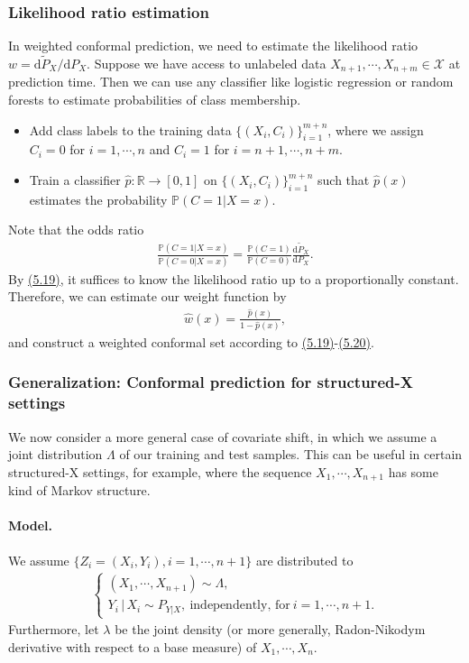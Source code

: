 \documentclass{article}
\numberwithin{equation}{section}
\begin{document}
\subsubsection{Likelihood ratio estimation}
In weighted conformal prediction, we need to estimate the likelihood ratio $w=\mathrm{d}\widetilde{P}_X/\mathrm{d}P_X$. Suppose we have access to unlabeled data $X_{n+1},\cdots,X_{n+m}\in\mathcal{X}$ at prediction time. Then we can use any classifier like logistic regression or random forests to estimate probabilities of class membership.
\begin{itemize}
	\item Add class labels to the training data $\{(X_i,C_i)\}_{i=1}^{m+n}$, where we assign $C_i=0$ for $i=1,\cdots,n$ and $C_i=1$ for $i=n+1,\cdots,n+m.$
	\item Train a classifier $\widehat{p}:\mathbb{R}\to[0,1]$ on $\{(X_i,C_i)\}_{i=1}^{m+n}$ such that $\widehat{p}(x)$ estimates the probability $\mathbb{P}(C=1|X=x)$.
\end{itemize}

Note that the odds ratio
\begin{align*}
	\frac{\mathbb{P}(C=1|X=x)}{\mathbb{P}(C=0|X=x)} = \frac{\mathbb{P}(C=1)}{\mathbb{P}(C=0)}\frac{\mathrm{d}\widetilde{P}_X}{\mathrm{d}P_X}.\tag{5.24}
\end{align*}
By \hyperref[5.19]{(5.19)}, it suffices to know the likelihood ratio up to a proportionally constant. Therefore, we can estimate our weight function by
\begin{align*}
	\widehat{w}(x) = \frac{\widehat{p}(x)}{1-\widehat{p}(x)},\tag{5.25}
\end{align*}
and construct a weighted conformal set according to \hyperref[5.19]{(5.19)}-\hyperref[5.20]{(5.20)}.

\subsubsection{Generalization: Conformal prediction for structured-X settings}
We now consider a more general case of covariate shift, in which we assume a joint distribution $\Lambda$ of our training and test samples. This can be useful in certain structured-X settings, for example, where the sequence $X_1, \cdots, X_{n+1}$ has some kind of Markov structure.

\paragraph{Model.} We assume $\{Z_i=(X_i,Y_i),i=1,\cdots,n+1\}$ are distributed to
\begin{align*}
	\begin{cases}
		(X_1,\cdots,X_{n+1})\sim\Lambda,\\
		Y_i\,|\,X_i\sim P_{Y|X},\ \text{independently, for}\ i=1,\cdots,n+1.
	\end{cases}\tag{5.26}
\end{align*}
Furthermore, let $\lambda$ be the joint density (or more generally, Radon-Nikodym derivative with respect to a base measure) of $X_1,\cdots,X_n.$
\end{document}
